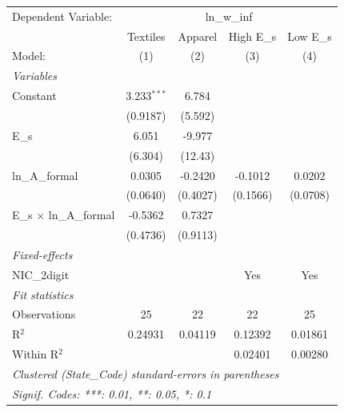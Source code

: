 
\begingroup
\centering
\begin{tabular}{lcccc}
   \tabularnewline \midrule \midrule
   Dependent Variable: & \multicolumn{4}{c}{ln\_w\_inf}\\
                                   & Textiles      & Apparel  & High E\_s  & Low E\_s \\    
   Model:                          & (1)           & (2)      & (3)        & (4)\\  
   \midrule
   \emph{Variables}\\
   Constant                        & 3.233$^{***}$ & 6.784    &            &   \\   
                                   & (0.9187)      & (5.592)  &            &   \\   
   E\_s                            & 6.051         & -9.977   &            &   \\   
                                   & (6.304)       & (12.43)  &            &   \\   
   ln\_A\_formal                   & 0.0305        & -0.2420  & -0.1012    & 0.0202\\   
                                   & (0.0640)      & (0.4027) & (0.1566)   & (0.0708)\\   
   E\_s $\times$ ln\_A\_formal     & -0.5362       & 0.7327   &            &   \\   
                                   & (0.4736)      & (0.9113) &            &   \\   
   \midrule
   \emph{Fixed-effects}\\
   NIC\_2digit                     &               &          & Yes        & Yes\\  
   \midrule
   \emph{Fit statistics}\\
   Observations                    & 25            & 22       & 22         & 25\\  
   R$^2$                           & 0.24931       & 0.04119  & 0.12392    & 0.01861\\  
   Within R$^2$                    &               &          & 0.02401    & 0.00280\\  
   \midrule \midrule
   \multicolumn{5}{l}{\emph{Clustered (State\_Code) standard-errors in parentheses}}\\
   \multicolumn{5}{l}{\emph{Signif. Codes: ***: 0.01, **: 0.05, *: 0.1}}\\
\end{tabular}
\par\endgroup


